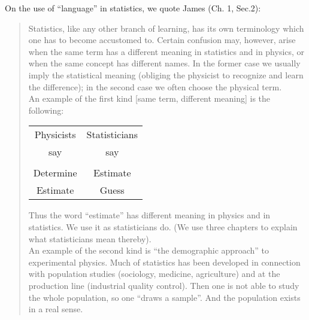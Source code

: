 \documentclass[12pt]{article}
\begin{document}
\noindent On the use of ``language'' in statistics, we quote James (Ch. 1, Sec.2):
\begin{quote}
Statistics, like any other branch of learning, has its own terminology which one has to become accustomed to.
Certain confusion may, however, arise when the same term has a different meaning in statistics and in physics,
    or when the same concept has different names.
In the former case  we usually imply the statistical meaning (obliging the physicist to recognize and learn
     the difference);  in the second case we often choose the physical term.\\

\noindent 	 An example of the first kind [same term, different meaning] is the following:
\begin{center}
   \begin{tabular}{c c}
       Physicists  &  Statisticians \\
	    say           &  say \\
		 \hline  \\
		Determine  &  Estimate  \\
		Estimate    &   Guess  
	\end{tabular}
\end{center}
Thus the word ``estimate'' has different meaning in physics and in statistics. We use it as
   statisticians do. 
(We use three chapters to explain what statisticians mean thereby).\\
   
An example of the second kind is ``the demographic approach''  to experimental physics.
Much of statistics has been developed in connection with population studies (sociology,
    medicine, agriculture) and at the production line (industrial quality control).
	Then one is not able to study the whole population, so one ``draws a sample''.
And the population exists in a real sense.\\


\end{quote}
\end{document}
